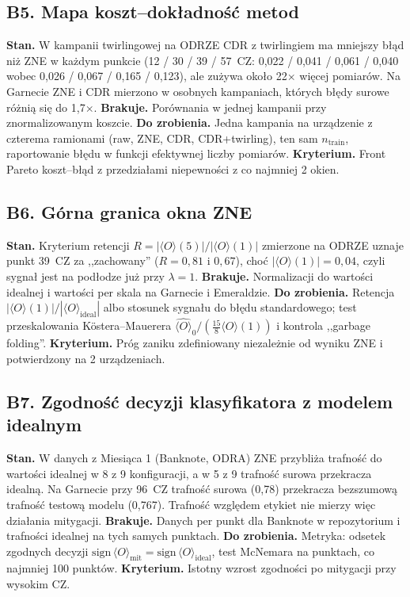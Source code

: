 \documentclass[11pt,a4paper]{article}
\newcommand{\expv}{\langle O\rangle}
\begin{document}
\subsection*{B5. Mapa koszt--dokładność metod}
\textbf{Stan.} W kampanii twirlingowej na ODRZE CDR z twirlingiem ma mniejszy błąd niż ZNE
w każdym punkcie (12 / 30 / 39 / 57~CZ: 0{,}022 / 0{,}041 / 0{,}061 / 0{,}040 wobec
0{,}026 / 0{,}067 / 0{,}165 / 0{,}123), ale zużywa około 22$\times$ więcej pomiarów.
Na Garnecie ZNE i CDR mierzono w osobnych kampaniach, których błędy surowe różnią się do
1{,}7$\times$. \textbf{Brakuje.} Porównania w jednej kampanii przy znormalizowanym koszcie.
\textbf{Do zrobienia.} Jedna kampania na urządzenie z czterema ramionami (raw, ZNE, CDR,
CDR+twirling), ten sam $n_{\text{train}}$, raportowanie błędu w funkcji efektywnej liczby
pomiarów. \textbf{Kryterium.} Front Pareto koszt--błąd z przedziałami niepewności z co
najmniej 2 okien.

\subsection*{B6. Górna granica okna ZNE}
\textbf{Stan.} Kryterium retencji $R=|\expv(5)|/|\expv(1)|$ zmierzone na ODRZE uznaje punkt
39~CZ za ,,zachowany'' ($R=0{,}81$ i $0{,}67$), choć $|\expv(1)|=0{,}04$, czyli sygnał jest
na podłodze już przy $\lambda=1$. \textbf{Brakuje.} Normalizacji do wartości idealnej i
wartości per skala na Garnecie i Emeraldzie. \textbf{Do zrobienia.} Retencja
$|\expv(1)|/|\expv_{\text{ideal}}|$ albo stosunek sygnału do błędu standardowego; test
przeskalowania Köstera--Mauerera
$\hat{\expv}_0/(\tfrac{15}{8}\expv(1))$ i kontrola ,,garbage folding''.
\textbf{Kryterium.} Próg zaniku zdefiniowany niezależnie od wyniku ZNE i potwierdzony na
2 urządzeniach.

\subsection*{B7. Zgodność decyzji klasyfikatora z modelem idealnym}
\textbf{Stan.} W danych z Miesiąca 1 (Banknote, ODRA) ZNE przybliża trafność do wartości
idealnej w 8 z 9 konfiguracji, a w 5 z 9 trafność surowa przekracza idealną. Na Garnecie
przy 96~CZ trafność surowa (0{,}78) przekracza bezszumową trafność testową modelu (0{,}767).
Trafność względem etykiet nie mierzy więc działania mitygacji. \textbf{Brakuje.} Danych per
punkt dla Banknote w repozytorium i trafności idealnej na tych samych punktach.
\textbf{Do zrobienia.} Metryka: odsetek zgodnych decyzji
$\mathrm{sign}\,\expv_{\text{mit}}=\mathrm{sign}\,\expv_{\text{ideal}}$, test McNemara na
punktach, co najmniej 100 punktów. \textbf{Kryterium.} Istotny wzrost zgodności po
mitygacji przy wysokim CZ.
\end{document}
